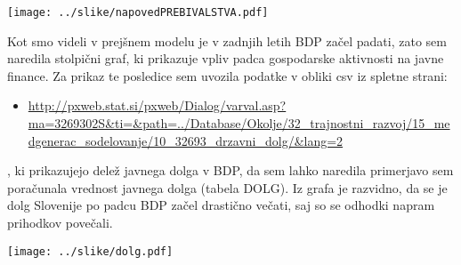 \documentclass[a4paper, 11pt]{article}
\begin{document}
\newpage
\begin{center}
\texttt{[image: ../slike/napovedPREBIVALSTVA.pdf]}
\end{center} 


Kot smo videli v prejšnem modelu je v zadnjih letih BDP začel padati, zato sem naredila stolpični graf, ki prikazuje vpliv padca gospodarske aktivnosti na javne finance.
Za prikaz te posledice sem uvozila podatke v obliki csv iz spletne strani:
\begin{itemize}
\item{\url{http://pxweb.stat.si/pxweb/Dialog/varval.asp?ma=3269302S&ti=&path=../Database/Okolje/32_trajnostni_razvoj/15_medgenerac_sodelovanje/10_32693_drzavni_dolg/&lang=2}}
\end{itemize}
, ki prikazujejo delež javnega dolga v BDP, da sem lahko naredila primerjavo sem poračunala vrednost javnega dolga (tabela DOLG).
Iz grafa je razvidno, da se je dolg Slovenije po padcu BDP začel drastično večati, saj so se odhodki napram prihodkov povečali.

\begin{center}
\texttt{[image: ../slike/dolg.pdf]}
\end{center}
\end{document}
